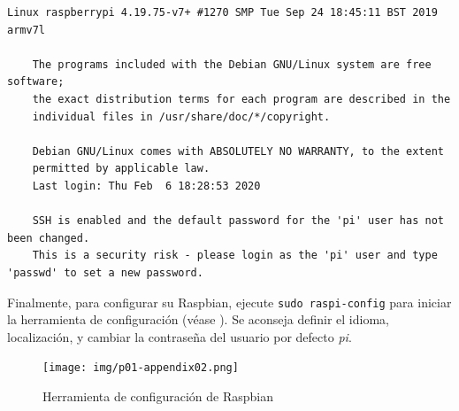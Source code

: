 \documentclass[letterpaper,10.5pt]{article}
\begin{document}
\begin{Verbatim}[fontsize=\footnotesize]
    Linux raspberrypi 4.19.75-v7+ #1270 SMP Tue Sep 24 18:45:11 BST 2019 armv7l

    The programs included with the Debian GNU/Linux system are free software;
    the exact distribution terms for each program are described in the
    individual files in /usr/share/doc/*/copyright.

    Debian GNU/Linux comes with ABSOLUTELY NO WARRANTY, to the extent
    permitted by applicable law.
    Last login: Thu Feb  6 18:28:53 2020

    SSH is enabled and the default password for the 'pi' user has not been changed.
    This is a security risk - please login as the 'pi' user and type 'passwd' to set a new password.
\end{Verbatim}

Finalmente, para configurar su Raspbian, ejecute \texttt{sudo raspi-config}  para iniciar la herramienta de configuración (véase ).
Se aconseja definir el idioma, localización, y cambiar la contraseña del usuario por defecto \textit{pi}.

\begin{figure}[H]
	\centering%
	\texttt{[image: img/p01-appendix02.png]} %
	\caption{Herramienta de configuración de Raspbian}
	\label{fig:raspberry-config-tool} %
\end{figure}
\end{document}
